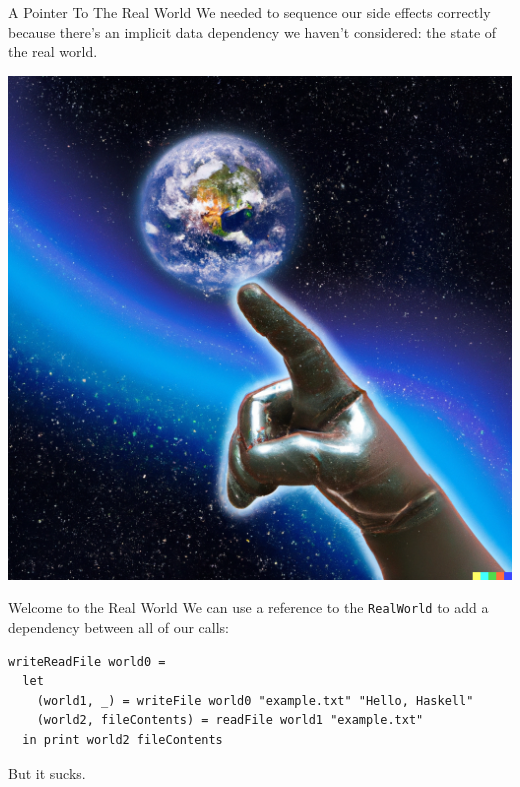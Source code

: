 \documentclass[10pt, presentation, colorlinks]{beamer}
\begin{document}
\begin{frame}[label={sec:orgaaa8417}]{A Pointer To The Real World}
We needed to \alert{sequence} our side effects correctly because there's an implicit data dependency we haven't considered: \alert{the state of the real world}.

\bigskip
\pause
\begin{center}
\includegraphics[height=0.4\textheight]{./img/pointing-to-the-real-world.png}
\end{center}
\end{frame}

\begin{frame}[label={sec:orgf90afd3},fragile]{Welcome to the Real World}
 We can use a reference to the \texttt{RealWorld} to add a dependency between all of our calls:

\bigskip
\pause

\begin{verbatim}
writeReadFile world0 =
  let
    (world1, _) = writeFile world0 "example.txt" "Hello, Haskell"
    (world2, fileContents) = readFile world1 "example.txt"
  in print world2 fileContents
\end{verbatim}

\bigskip
\pause

But it sucks.
\end{frame}
\end{document}
